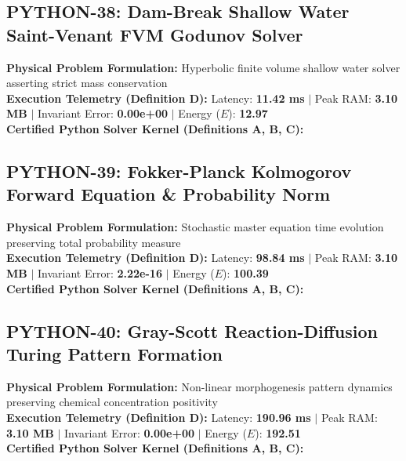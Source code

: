 \subsection{PYTHON-38: Dam-Break Shallow Water Saint-Venant FVM Godunov Solver}
\textbf{Physical Problem Formulation:} Hyperbolic finite volume shallow water solver asserting strict mass conservation\\
\textbf{Execution Telemetry (Definition D):} Latency: \textbf{11.42 ms} $|$ Peak RAM: \textbf{3.10 MB} $|$ Invariant Error: \textbf{0.00e+00} $|$ Energy ($E$): \textbf{12.97}\\

\textbf{Certified Python Solver Kernel (Definitions A, B, C):}


\vspace{1em}
\subsection{PYTHON-39: Fokker-Planck Kolmogorov Forward Equation \& Probability Norm}
\textbf{Physical Problem Formulation:} Stochastic master equation time evolution preserving total probability measure\\
\textbf{Execution Telemetry (Definition D):} Latency: \textbf{98.84 ms} $|$ Peak RAM: \textbf{3.10 MB} $|$ Invariant Error: \textbf{2.22e-16} $|$ Energy ($E$): \textbf{100.39}\\

\textbf{Certified Python Solver Kernel (Definitions A, B, C):}


\vspace{1em}
\subsection{PYTHON-40: Gray-Scott Reaction-Diffusion Turing Pattern Formation}
\textbf{Physical Problem Formulation:} Non-linear morphogenesis pattern dynamics preserving chemical concentration positivity\\
\textbf{Execution Telemetry (Definition D):} Latency: \textbf{190.96 ms} $|$ Peak RAM: \textbf{3.10 MB} $|$ Invariant Error: \textbf{0.00e+00} $|$ Energy ($E$): \textbf{192.51}\\

\textbf{Certified Python Solver Kernel (Definitions A, B, C):}


\vspace{1em}
